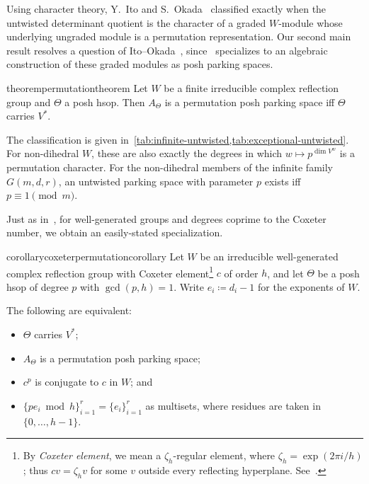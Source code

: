 \documentclass[11pt]{amsart}
\newcommand{\defeq}{\coloneqq}
\theoremstyle{definition}
\begin{document}
Using character theory, Y.~Ito and S.~Okada~\cite[Theorem~1.4]{IO} classified exactly when the untwisted determinant quotient is the character of a graded $W$-module whose underlying ungraded module is a permutation representation.  %
Our second main result resolves a question of Ito--Okada~\cite[Problem 7.3(2)]{IO}, since~ specializes to an algebraic construction of these graded modules as posh parking spaces. %

\begin{restatable}{theorem}{permutationtheorem}\label{c:thm:untwisted}
Let $W$ be a finite irreducible complex reflection group and $\Theta$ a posh hsop. Then $A_\Theta$ is a permutation posh parking space iff $\Theta$ carries $V^*$.
\end{restatable}

The classification is given in~\cref{tab:infinite-untwisted,tab:exceptional-untwisted}.
For non-dihedral $W$, these are also exactly the degrees in which $w\mapsto p^{\dim V^w}$ is a permutation character.  For the non-dihedral members of the infinite family $G(m,d,r)$, an untwisted parking space with parameter $p$ exists iff $p\equiv1\pmod m$.

Just as in~, for well-generated groups and degrees coprime to the Coxeter number,
we obtain an easily-stated specialization.

\begin{restatable}{corollary}{coxeterpermutationcorollary}\label{cor:coxeter-permutation}
Let $W$ be an irreducible well-generated complex reflection group with
Coxeter element\footnote{By \emph{Coxeter element}, we mean a
$\zeta_h$-regular element, where $\zeta_h=\exp(2\pi i/h)$;
thus $cv=\zeta_hv$ for some $v$ outside every reflecting hyperplane.
See~\cite[Section~1.1]{RRS}.} $c$ of order $h$, and let $\Theta$ be a posh hsop of degree $p$
with $\gcd(p,h)=1$. Write $e_i\defeq d_i-1$ for the exponents of $W$.

The following are equivalent:
\begin{itemize}
\item $\Theta$ carries $V^*$;
\item $A_\Theta$ is a permutation posh parking space;
\item $c^p$ is conjugate to $c$ in $W$; and
\item $
 \{p e_i\bmod h\}_{i=1}^r=\{e_i\}_{i=1}^r$
as multisets, where residues are taken in $\{0,\ldots,h-1\}$.
\end{itemize}
\end{restatable}
\end{document}
